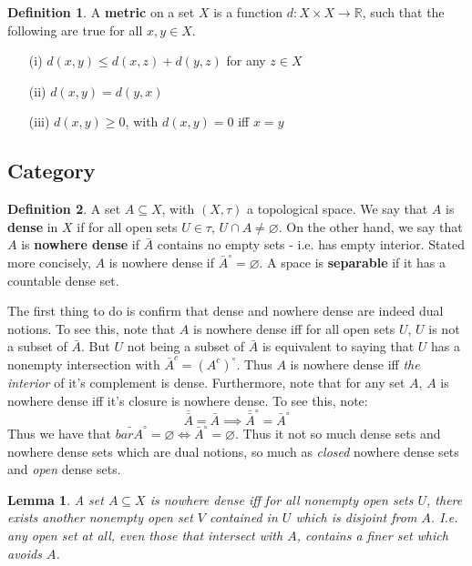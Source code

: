 \documentclass{article}
\theoremstyle{definition}
\newtheorem{definition}{Definition}[section]
\theoremstyle{plain}
\theoremstyle{theorem}
\newtheorem{lemma}{Lemma}[section]
\begin{document}
	\begin{definition}
		A \textbf{metric} on a set $X$ is a function $d:X \times X \to \mathbb{R}$, such that the following are true for all $x,y \in X$.
		\begin{itemize}
			\item[(i)] $d(x,y) \leq d(x,z)+d(y,z)$ for any $z \in X$
			\item[(ii)] $d(x,y) = d(y,x)$
			\item[(iii)] $d(x,y) \geq 0$, with $d(x,y) = 0$ iff $x=y$
		\end{itemize}
	\end{definition}
\subsection{Category}
\begin{definition}
	A set $A \subseteq X$, with $(X,\tau)$ a topological space. We say that $A$ is \textbf{dense} in $X$ if for all open sets $U \in \tau$, $U \cap A \neq \varnothing$. On the other hand, we say that $A$ is \textbf{nowhere dense} if $\bar{A}$ contains no empty sets - i.e. has empty interior. Stated more concisely, $A$ is nowhere dense if $\bar{A}^{\circ} = \varnothing$. A space is \textbf{separable} if it has a countable dense set. 
\end{definition}
The first thing to do is confirm that dense and nowhere dense are indeed dual notions. To see this, note that $A$ is nowhere dense iff for all open sets $U$, $U$ is not a subset of $\bar{A}$. But $U$ not being a subset of $\bar{A}$ is equivalent to saying that $U$ has a nonempty intersection with $\bar{A}^c = (A^c)^{\circ}$. Thus $A$ is nowhere dense iff \textit{the interior} of it's complement is dense. Furthermore, note that for any set $A$, $A$ is nowhere dense iff it's closure is nowhere dense. To see this, note:
\[ \bar{\bar{A}} = \bar{A} \implies \bar{\bar{A}}^{\circ} = \bar{A}^{\circ} \]
Thus we have that $\bar{bar{A}}^{\circ} = \varnothing \iff \bar{A}^{\circ} = \varnothing$. Thus it not so much dense sets and nowhere dense sets which are dual notions, so much as \textit{closed} nowhere dense sets and \textit{open} dense sets.  
\begin{lemma}
	A set $A \subseteq X$ is nowhere dense iff for all nonempty open sets $U$, there exists another nonempty open set $V$ contained in $U$ which is disjoint from $A$. I.e. any open set at all, even those that intersect with $A$, contains a finer set which avoids $A$.
\end{lemma}
\end{document}
